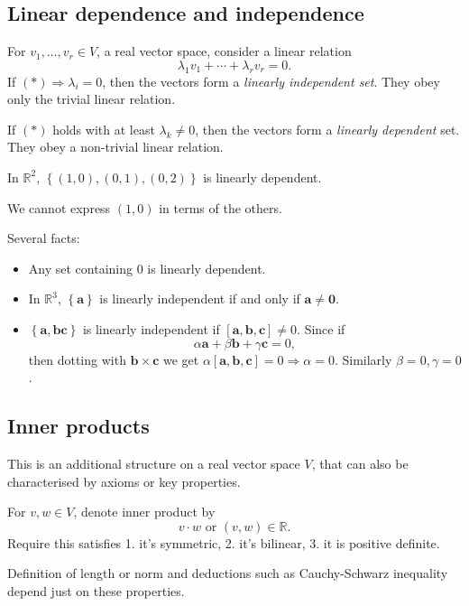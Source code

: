 \documentclass[10pt]{article}
\newcommand{\bluecomment}[1]{{\color{blue}#1}}
\begin{document}
    \subsection{Linear dependence and independence}
    For $ v_1,\dots,v_r\in V $, a real vector space, consider a linear relation
    \[
        \lambda_1 v_1+\cdots+\lambda_r v_r=0\tag{*}
    .\]
    If $ (*)\Rightarrow \lambda_i=0 $, then the vectors form a \textit{linearly independent set}. They obey only the trivial linear relation.

    If $ (*) $ holds with at least $ \lambda_k\neq 0 $, then the vectors form a \textit{linearly dependent} set. They obey a non-trivial linear relation.
    \begin{example}
        In $ \mathbb{R}^2 $, $ \left\{ (1,0),(0,1),(0,2)\right\} $ is linearly dependent.

        \bluecomment{We cannot express $(1,0)$ in terms of the others.}
    \end{example}
    Several facts:
    \begin{itemize}
        \item Any set containing $0$ is linearly dependent.
        \item In $ \mathbb{R}^3 $, $ \left\{ \mathbf{a}\right\} $ is linearly independent if and only if $ \mathbf{a}\neq \mathbf{0} $.
        \item $ \left\{ \mathbf{a},\mathbf{b}\mathbf{c}\right\} $ is linearly independent if $ [\mathbf{a},\mathbf{b},\mathbf{c}]\neq 0 $. Since if 
        \[
            \alpha \mathbf{a}+\beta \mathbf{b}+\gamma \mathbf{c}=0
        ,\]
        then dotting with $ \mathbf{b}\times \mathbf{c} $ we get $ \alpha[\mathbf{a},\mathbf{b},\mathbf{c}]=0 \Rightarrow \alpha=0 $. Similarly $ \beta=0, \gamma=0 $.
    \end{itemize}
    \subsection{Inner products}
    This is an additional structure on a real vector space $V$, that can also be characterised by axioms or key properties.

    For $v,w\in V$, denote inner product by 
    \[
        v\cdot w \text{  or  } (v,w)\in \mathbb{R} 
    .\]
    Require this satisfies 1. it's symmetric, 2. it's bilinear, 3. it is positive definite.

    Definition of length or norm and deductions such as Cauchy-Schwarz inequality depend just on these properties.
\end{document}
